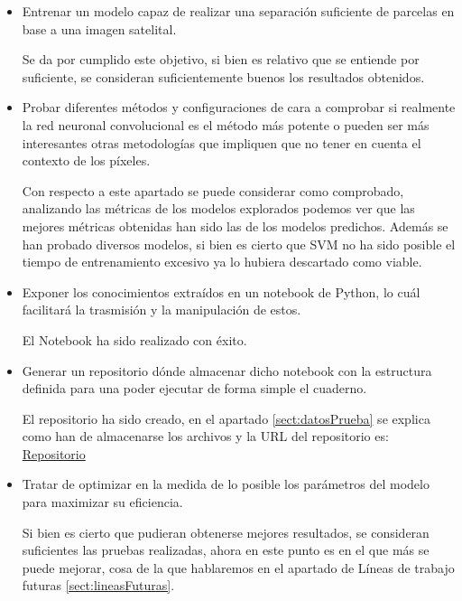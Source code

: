 \begin{itemize}
	\item Entrenar un modelo capaz de realizar una separación suficiente de parcelas en base a una imagen satelital. 
	
	Se da por cumplido este objetivo, si bien es relativo que se entiende por suficiente, se consideran suficientemente buenos los resultados obtenidos.
	
	\item Probar diferentes métodos y configuraciones de cara a comprobar si realmente la red neuronal convolucional es el método más potente o pueden ser más interesantes otras metodologías que impliquen que no tener en cuenta el contexto de los píxeles.
	
	Con respecto a este apartado se puede considerar como comprobado, analizando las métricas de los modelos explorados podemos ver que las mejores métricas obtenidas han sido las de los modelos predichos. Además se han probado diversos modelos, si bien es cierto que SVM no ha sido posible el tiempo de entrenamiento excesivo ya lo hubiera descartado como viable.
	
	\item Exponer los conocimientos extraídos en un notebook de Python, lo cuál facilitará la trasmisión y la manipulación de estos.
	
	El Notebook ha sido realizado con éxito.
	
	\item Generar un repositorio dónde almacenar dicho notebook con la estructura definida para una poder ejecutar de forma simple el cuaderno.
	
	El repositorio ha sido creado, en el apartado \ref{sect:datosPrueba} se explica como han de almacenarse los archivos y la URL del repositorio es: 
	\href{https://github.com/wgm1001/Trabajo_fin_master_deteccion_bordes}{Repositorio} 
	
	\item Tratar de optimizar en la medida de lo posible los parámetros del modelo para maximizar su eficiencia.
	
	Si bien es cierto que pudieran obtenerse mejores resultados, se consideran suficientes las pruebas realizadas, ahora en este punto es en el que más se puede mejorar, cosa de la que hablaremos en el apartado de Líneas de trabajo futuras \ref{sect:lineasFuturas}.
		
\end{itemize}

